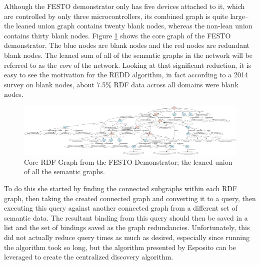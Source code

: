 Although the FESTO demonstrator only has five devices attached to it, which are controlled by only three microcontrollers, its combined graph is quite large--the leaned union graph contains twenty blank nodes, whereas the non-lean union contains thirty blank nodes. Figure \ref{fig:festoUnion} shows the core graph of the FESTO demonstrator. The blue nodes are blank nodes and the red nodes are redundant blank nodes. The leaned sum of all of the semantic graphs in the network will be referred to as the \textit{core} of the network. Looking at that significant reduction, it is easy to see the motivation for the REDD algorithm, in fact according to a 2014 survey on blank nodes, about 7.5\% RDF data across all domains were blank nodes\cite{Mallea.2011}.

\begin{figure}
	\centering
	\includegraphics[width=\textwidth]{Figures/RDFUnion.png}
    \caption{Core RDF Graph from the FESTO Demonstrator; the leaned union of all the semantic graphs.}
    \label{fig:festoUnion}
\end{figure}

To do this she started by finding the connected subgraphs within each RDF graph, then taking the created connected graph and converting it to a query, then executing this query against another connected graph from a different set of semantic data. The resultant binding from this query should then be saved in a list and the set of bindings saved as the graph redundancies. Unfortunately, this did not actually reduce query times as much as desired, especially since running the algorithm took so long, but the algorithm presented by Esposito can be leveraged to create the centralized discovery algorithm.

